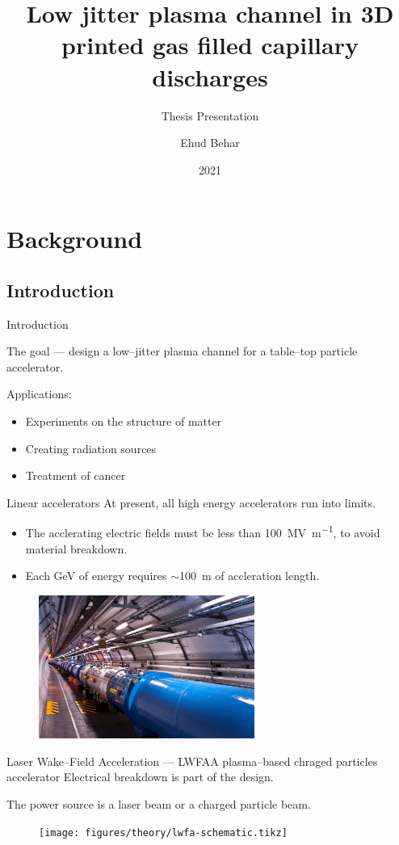 \documentclass[dvipsnames]{beamer}
\title{Low jitter plasma channel in 3D printed gas filled capillary discharges}
\subtitle{Thesis Presentation}
\author{Ehud Behar}
\institute{Hebrew University of Jerusalem}
\date{2021}
\begin{document}
\frame{\titlepage}

\section{Background}
\subsection{Introduction}
  \begin{frame}{Introduction}
  \begin{center}
    The goal --- design a low--jitter plasma channel for a table--top particle accelerator.
  \end{center}
    Applications:
    \begin{itemize}
        \item[\textbullet] Experiments on the structure of matter
        \item[\textbullet] Creating radiation sources
        \item[\textbullet] Treatment of cancer
    \end{itemize}
  \end{frame}

\begin{frame}{Linear accelerators}
At present, all high energy accelerators run into limits.
\begin{itemize}
\item[\textbullet] The acclerating electric fields must be less than \SI[per-mode=symbol]{100}{\mega \V \per\meter}, to avoid material breakdown.
\item[\textbullet] Each \si{\giga \eV} of energy requires $\sim$\SI{100}{\meter} of accleration length.
\end{itemize}
\begin{figure}
\includegraphics[width=200pt]{figures/theory/lhc_cern_compressed.jpg}
\end{figure}
\end{frame}
\begin{frame}{Laser Wake--Field Acceleration --- LWFA}{A plasma--based chraged particles accelerator}
Electrical breakdown is part of the design.

The power source is a laser beam or a charged particle beam.
\begin{figure}
\texttt{[image: figures/theory/lwfa-schematic.tikz]}
\end{figure}
\end{frame}
\end{document}
